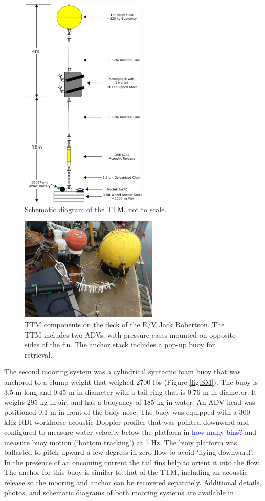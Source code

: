 \documentclass[twocol]{ametsoc}
\newcommand{\note}[1]{\textcolor{blue}{#1}}
\begin{document}
\begin{figure}[t]
  \centering
  \includegraphics[width=2.4in]{ttm04b}
  \caption{Schematic diagram of the TTM, not to scale.}
  \label{fig:ttm:diagram}
\end{figure}

\begin{figure}[t]
  \centering
  \includegraphics[width=2.6in]{TTM_image01}  
  \caption{TTM components on the deck of the R/V Jack Robertson. The TTM includes two ADVs, with pressure-cases mounted on opposite sides of the fin. The anchor stack includes a pop-up buoy for retrieval. }
  \label{fig:ttm:photo}
\end{figure}

The second mooring system was a cylindrical syntactic foam buoy that was anchored to a clump weight that weighed 2700 lbs (Figure \ref{fig:SM}). The buoy is 3.5 m long and 0.45 m in diameter with a tail ring that is 0.76 m in diameter. It weighs 295 kg in air, and has a buoyancy of 185 kg in water. An ADV head was positioned 0.1 m in front of the buoy nose.  The buoy was equipped with a 300 kHz RDI workhorse acoustic Doppler profiler that was pointed downward and configured to measure water velocity below the platform in \note{how many bins?} and measure buoy motion (`bottom tracking') at 1 Hz. The buoy platform was ballasted to pitch upward a few degrees in zero-flow to avoid `flying downward'. In the presence of an oncoming current the tail fins help to orient it into the flow. The anchor for this buoy is similar to that of the TTM, including an acoustic release so the mooring and anchor can be recovered separately. Additional details, photos, and schematic diagrams of both mooring systems are available in \cite{Harding_MotionPaper}.
\end{document}
